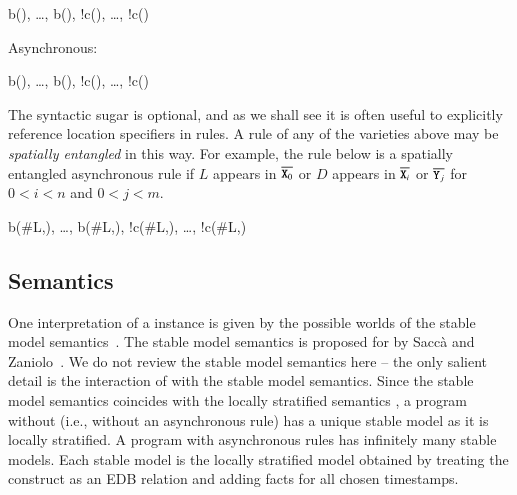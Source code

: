 \begin{Drules}
        {b(), \ldots, b(), !c(), \ldots, !c()}
\end{Drules}

%

Asynchronous:

\begin{Drules}
        {b(), \ldots, b(), !c(), \ldots, !c()}
\end{Drules}

The syntactic sugar is optional, and as we shall see it is often useful to explicitly reference location specifiers in rules.  A rule of any of the
varieties above may be \emph{spatially entangled} in this way. For example, the rule below is a spatially entangled asynchronous rule if $L$ appears
in $\od{X\sub{0}}$ or $D$ appears in $\od{X\sub{i}}$ or $\od{Y\sub{j}}$ for $0 <
i < n$ and $0 < j < m$. 

\begin{Drules}
        {b(\#L,), \ldots, b(\#L,), !c(\#L,), \ldots, !c(\#L,)}
\end{Drules}


\subsection{Semantics}
One interpretation of a \lang instance is given by the possible worlds of the
stable model semantics~\cite{stable-model}.  The stable model semantics is proposed for  by Sacc\`{a} and Zaniolo~\cite{sacca-zaniolo}.
We do not review the stable model
semantics here -- the only salient detail is the interaction of 
with the stable model semantics.  Since the stable model semantics coincides with the locally stratified semantics , a \lang program without  (i.e., without an asynchronous rule) has a unique stable model as it is locally stratified.  A \lang program with asynchronous rules has infinitely many stable models.  Each stable model is the locally stratified model obtained by treating the  construct as an EDB relation and adding facts for all chosen timestamps.

